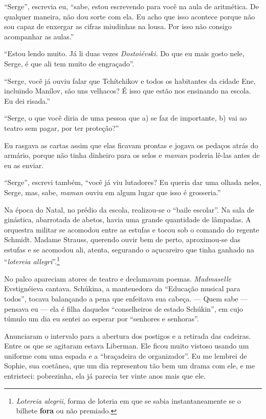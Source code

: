 ``Serge'', escrevia eu, ``sabe, estou escrevendo para você na aula de
aritmética. De qualquer maneira, não dou sorte com ela. Eu acho que isso
acontece porque não sou capaz de enxergar as cifras miudinhas na lousa.
Por isso não consigo acompanhar as aulas.''

``Estou lendo muito. Já li duas vezes \emph{Dostoiévski}. Do que eu mais
gosto nele, Serge, é que ali tem muito de engraçado''.

``Serge, você já ouviu falar que Tchítchikov e todos os habitantes da
cidade Ene, incluindo Manílov, são uns velhacos? É isso que estão nos
ensinando na escola. Eu dei risada.''

``Serge, o que você diria de uma pessoa que a) se faz de importante, b)
vai ao teatro sem pagar, por ter proteção?''

Eu rasgava as cartas assim que elas ficavam prontas e jogava os pedaços
atrás do armário, porque não tinha dinheiro para os selos e \emph{maman}
poderia lê-las antes de eu as enviar.

``Serge'', escrevi também, ``você já viu lutadores? Eu queria dar uma
olhada neles, Serge, mas, sabe, \emph{maman} ouviu em algum lugar que
isso é grosseria.''

Na época do Natal, no prédio da escola, realizou-se o ``baile escolar''.
Na sala de ginástica, abarrotada de abetos, havia uma grande quantidade
de lâmpadas. A orquestra militar se acomodou entre as estufas e tocou
sob o comando do regente Schmidt. Madame Strauss, querendo ouvir bem de
perto, aproximou-se das estufas e se acomodou ali, atenta, segurando o
açucareiro que tinha ganhado na ``\emph{lotereia allegri}''.\footnote{\emph{Lotereia
  alegrii}, forma de loteria em que se sabia instantaneamente se o
  bilhete \textbf{fora} ou não premiado.}

No palco apareciam atores de teatro e declamavam poemas.
\emph{Madmaselle} Evstignéieva cantava. Schúkina, a mantenedora da
``Educação musical para todos'', tocava balançando a pena que enfeitava
sua cabeça. --- Quem sabe --- pensava eu --- ela é filha daqueles
``conselheiros de estado Schúkin'', em cujo túmulo um dia eu sentei ao
esperar por ``senhores e senhoras''.

Anunciaram o intervalo para a abertura dos postigos e a retirada das
cadeiras. Entre os que se agitaram estava Liberman. Ele ficou muito
vistoso usando um uniforme com uma espada e a ``braçadeira de
organizador''. Eu me lembrei de Sophie, sua coetânea, que um dia
representou tão bem um drama com ele, e me entristeci: pobrezinha, ela
já parecia ter vinte anos mais que ele.


